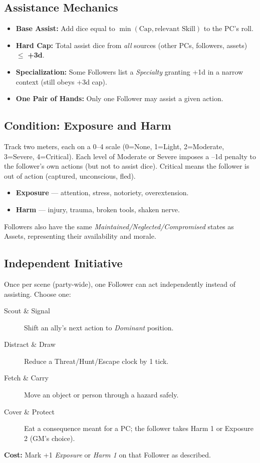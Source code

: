 \subsection*{Assistance Mechanics}
\begin{itemize}
  \item \textbf{Base Assist:} Add dice equal to \(\min(\text{Cap}, \text{relevant Skill})\) to the PC’s roll.
  \item \textbf{Hard Cap:} Total assist dice from \emph{all} sources (other PCs, followers, assets) \(\leq\) \textbf{+3d}. 
  \item \textbf{Specialization:} Some Followers list a \emph{Specialty} granting +1d in a narrow context (still obeys +3d cap).
  \item \textbf{One Pair of Hands:} Only one Follower may assist a given action.
\end{itemize}

\subsection*{Condition: Exposure and Harm}
Track two meters, each on a 0–4 scale (0=None, 1=Light, 2=Moderate, 3=Severe, 4=Critical). Each level of Moderate or Severe imposes a –1d penalty to the follower’s own actions (but not to assist dice). Critical means the follower is out of action (captured, unconscious, fled).
\begin{itemize}
  \item \textbf{Exposure} — attention, stress, notoriety, overextension.
  \item \textbf{Harm} — injury, trauma, broken tools, shaken nerve.
\end{itemize}
Followers also have the same \emph{Maintained/Neglected/Compromised} states as Assets, representing their availability and morale.

\subsection*{Independent Initiative}
Once per scene (party-wide), one Follower can act independently instead of assisting. Choose one:
\begin{description}
  \item[Scout \& Signal] Shift an ally’s next action to \emph{Dominant} position.
  \item[Distract \& Draw] Reduce a Threat/Hunt/Escape clock by 1 tick.
  \item[Fetch \& Carry] Move an object or person through a hazard safely.
  \item[Cover \& Protect] Eat a consequence meant for a PC; the follower takes Harm 1 or Exposure 2 (GM’s choice).
\end{description}
\textbf{Cost:} Mark +1 \emph{Exposure} or \emph{Harm 1} on that Follower as described.


